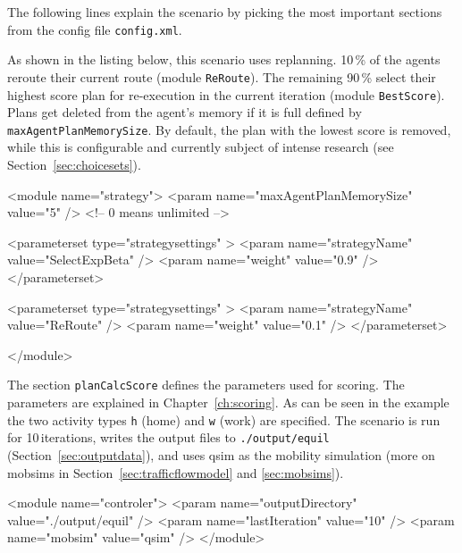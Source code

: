 The following lines explain the scenario by picking the most important sections from the config file \lstinline|config.xml|.

As shown in the listing below, this scenario uses replanning. 10\,\% of the agents reroute their current route (module \lstinline|ReRoute|). The remaining 90\,\% select their highest score plan for re-execution in the current iteration (module \lstinline|BestScore|). Plans get deleted from the agent's memory if it is full defined by \lstinline|maxAgentPlanMemorySize|. By default, the plan with the lowest score is removed, while this is configurable and currently subject of intense research (see Section~\ref{sec:choicesets}).
%
\begin{xml}
<module name="strategy">
	<param name="maxAgentPlanMemorySize" value="5" /> <!-- 0 means unlimited -->
	
	<parameterset type="strategysettings" >
		<param name="strategyName" value="SelectExpBeta" />
		<param name="weight" value="0.9" />
	</parameterset>
	
	<parameterset type="strategysettings" >
		<param name="strategyName" value="ReRoute" />
		<param name="weight" value="0.1" />
	</parameterset>
	
</module>
\end{xml}


The section \lstinline|planCalcScore| defines the parameters used for scoring. The parameters are explained in Chapter~\ref{ch:scoring}. As can be seen in the example the two activity types \lstinline|h| (home) and \lstinline|w| (work) are specified. The scenario is run for 10\,iterations, writes the output files to \lstinline|./output/equil| (Section~\ref{sec:outputdata}), and uses \gls{qsim} as the mobility simulation (more on \glspl{mobsim} in Section~\ref{sec:trafficflowmodel} and \ref{sec:mobsims}).

\begin{xml}
<module name="controler">
	<param name="outputDirectory" value="./output/equil" />
	<param name="lastIteration" value="10" />
	<param name="mobsim" value="qsim" />	
</module>
\end{xml}


